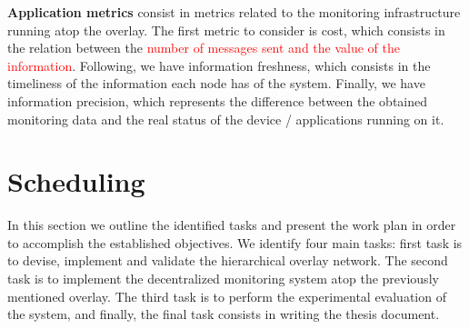 \textbf{Application metrics}  consist in metrics related to the monitoring infrastructure running atop the overlay. The first metric to consider is cost, which consists in the relation between the \textcolor{red}{number of messages sent and the value of the information}. Following, we have information freshness, which consists in the timeliness of the information each node has of the system. Finally, we have information precision, which represents the difference between the obtained monitoring data and the real status of the device / applications running on it.  

\section{Scheduling}

In this section we outline the identified tasks and present the work plan in order to accomplish the established objectives. We identify four main tasks: first task is to devise, implement and validate the hierarchical overlay network. The second task is to implement the decentralized monitoring system atop the previously mentioned overlay. The third task is to perform the experimental evaluation of the system, and finally, the final task consists in writing the thesis document.



